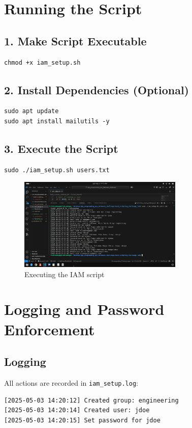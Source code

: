 \documentclass[a4paper,11pt]{article}
\begin{document}
\section*{Running the Script}

\subsection*{1. Make Script Executable}
\begin{lstlisting}
chmod +x iam_setup.sh
\end{lstlisting}

\subsection*{2. Install Dependencies (Optional)}
\begin{lstlisting}
sudo apt update
sudo apt install mailutils -y
\end{lstlisting}

\subsection*{3. Execute the Script}
\begin{lstlisting}
sudo ./iam_setup.sh users.txt
\end{lstlisting}

\begin{figure}[h!]
  \centering
  \includegraphics[width=0.7\textwidth]{screenshots/run_script.png}
  \caption{Executing the IAM script}
\end{figure}

\section*{Logging and Password Enforcement}

\subsection*{Logging}
All actions are recorded in \texttt{iam\_setup.log}:
\begin{lstlisting}
[2025-05-03 14:20:12] Created group: engineering
[2025-05-03 14:20:14] Created user: jdoe
[2025-05-03 14:20:15] Set password for jdoe
\end{lstlisting}
\end{document}
